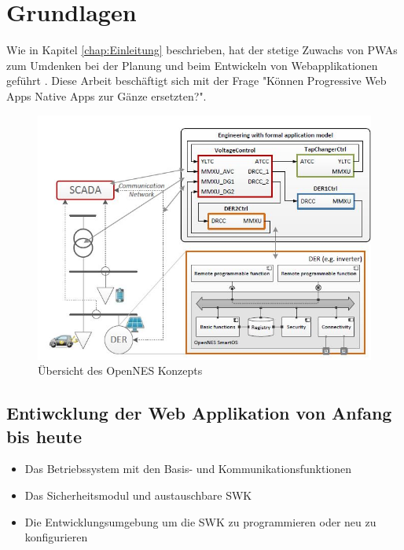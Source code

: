 \chapter{Grundlagen}
\thispagestyle{standard}
\pagestyle{standard}
\renewcommand{\footrulewidth}{0.4pt}

Wie in Kapitel \ref{chap:Einleitung} beschrieben, hat der stetige Zuwachs von \acs{PWA}s zum Umdenken bei der Planung und beim Entwickeln von Webapplikationen geführt \cite{DERs}.
Diese Arbeit beschäftigt sich mit der Frage "Können Progressive Web Apps Native Apps zur Gänze ersetzten?".
 


\begin{figure}[h]
	\centering
	\includegraphics[width=14cm]{BilderAllgemein/OpenNES_architecture}\medskip
	\caption{Übersicht des OpenNES Konzepts \cite{OpenNES}}
	\label{fig:Übersicht des OpenNES Konzepts}
\end{figure}

 
\section{Entiwcklung der Web Applikation von Anfang bis heute}

\begin{itemize}
    \item Das Betriebssystem mit den Basis- und Kommunikationsfunktionen
	\item Das Sicherheitsmodul und austauschbare \ac{SWK}
	\item Die Entwicklungsumgebung um die \acs{SWK} zu programmieren oder neu zu konfigurieren
\end{itemize}



